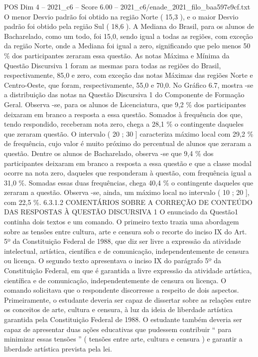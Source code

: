 \begin{textsample}{POS Dim 4 – 2021\_c6 – Score 6.00 – 2021\_c6/enade\_2021\_filo\_baa597e9cf.txt}
O menor Desvio padrão foi obtido na região Norte ( 15,3 ), e o maior Desvio padrão foi obtido pela região Sul ( 18,6 ).
A Mediana do Brasil, para os alunos de Bacharelado, como um todo, foi 15,0, sendo igual a todas as regiões, com exceção da região Norte, onde a Mediana foi igual a zero, significando que pelo menos 50 \% dos participantes zeraram essa questão.
As notas Máxima e Mínima da Questão Discursiva 1 foram as mesmas para todas as regiões do Brasil, respectivamente, 85,0 e zero, com exceção das notas Máximas das regiões Norte e Centro-Oeste, que foram, respectivamente, 55,0 e 70,0.
No Gráfico 6.7, mostra -se a distribuição das notas na Questão Discursiva 1 do Componente de Formação Geral.
Observa -se, para os alunos de Licenciatura, que 9,2 \% dos participantes deixaram em branco a resposta a essa questão.
Somados à frequência dos que, tendo respondido, receberam nota zero, chega a 28,1 \% o contingente daqueles que zeraram questão.
O intervalo ( 20 ; 30 ] caracteriza máximo local com 29,2 \% de frequência, cujo valor é muito próximo do percentual de alunos que zeraram a questão.
Dentre os alunos de Bacharelado, observa -se que 9,4 \% dos participantes deixaram em branco a resposta a essa questão e que a classe modal ocorre na nota zero, daqueles que responderam à questão, com frequência igual a 31,0 \%.
Somadas essas duas frequências, chega 40,4 \% o contingente daqueles que zeraram a questão.
Observa -se, ainda, um máximo local no intervalo ( 10 ; 20 ], com 22,5 \%. 6.3.1.2 COMENTÁRIOS SOBRE A CORREÇÃO DE CONTEÚDO DAS RESPOSTAS À QUESTÃO DISCURSIVA 1 O enunciado da Questão1 continha dois textos e um comando.
O primeiro texto trazia uma abordagem sobre as tensões entre cultura, arte e censura sob o recorte do inciso IX do Art. 5º da Constituição Federal de 1988, que diz ser livre a expressão da atividade intelectual, artística, científica e de comunicação, independentemente de censura ou licença.
O segundo texto apresentava o inciso IX do parágrafo 5º da Constituição Federal, em que é garantida a livre expressão da atividade artística, científica e de comunicação, independentemente de censura ou licença.
O comando solicitava que o respondente discorresse a respeito de dois aspectos.
Primeiramente, o estudante deveria ser capaz de dissertar sobre as relações entre os conceitos de arte, cultura e censura, à luz da ideia de liberdade artística garantida pela Constituição Federal de 1988.
O estudante também deveria ser capaz de apresentar duas ações educativas que pudessem contribuir “ para minimizar essas tensões ” ( tensões entre arte, cultura e censura ) e garantir a liberdade artística prevista pela lei.

\end{textsample}
